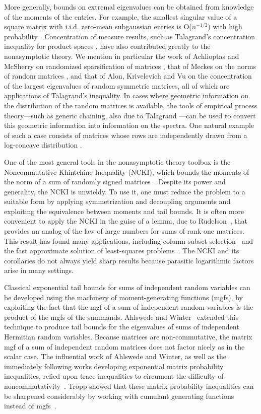 More generally, bounds on extremal eigenvalues can be obtained from knowledge of
the moments of the entries. For example, the smallest singular value of a square
matrix with i.i.d. zero-mean subgaussian entries is O($n^{-1/2}$) with high
probability \cite{RV08b}. Concentration of measure results, such as Talagrand's
concentration inequality for product spaces \cite{Talagrand95}, have also
contributed greatly to the nonasymptotic theory. We mention in particular the
work of Achlioptas and McSherry on randomized sparsification of matrices
\cite{AM01,AM07}, that of Meckes on the norms of random matrices
\cite{Meckes04}, and that of Alon, Krivelevich and Vu \cite{AKV02}
on the concentration of the largest eigenvalues of random symmetric matrices,
all of which are applications of Talagrand's inequality. In cases where
geometric information on the distribution of the random matrices is available,
the tools of empirical process theory---such as generic chaining, also due
to Talagrand \cite{
Talagrand05}---can be used to convert this geometric information into
information on the spectra. One natural example of such a case consists of
matrices whose rows are independently drawn from a log-concave distribution
\cite{MP06,ALPT10b}.

One of the most general tools in the nonasymptotic theory toolbox is
the Noncommutative Khintchine Inequality
(NCKI), which bounds the moments of the norm of a sum of randomly signed
matrices~\cite{Lust-PiquardPisier91}. Despite its power and generality, the NCKI
is unwieldy. To use it, one must reduce the problem to a suitable form by
applying symmetrization and decoupling arguments and exploiting the equivalence
between moments and tail bounds. It is often more convenient to apply the NCKI
in the guise of a lemma, due to Rudelson~\cite{RU99}, that provides an analog of
the law of large numbers for sums of rank-one matrices. This result has found
many applications, including column-subset selection~\cite{RV07} and the fast
approximate solution of least-squares problems~\cite{DMMS11}. The NCKI and its
corollaries do not always yield sharp results because parasitic logarithmic
factors arise in many settings.
 
Classical exponential tail bounds for sums of independent random variables
can be developed using the machinery of moment-generating functions (mgfs), by
exploiting the fact that the mgf of a sum of independent random variables
is the product of the mgfs of the summands. Ahlswede and 
Winter~\cite{AW02} extended this technique to produce tail bounds for the eigenvalues of
sums of independent Hermitian random variables. Because matrices are non-commutative,
the matrix mgf of a sum of independent random matrices does not factor nicely
as in the scalar case. The influential work of Ahlswede and Winter, as well as 
the immediately following works developing exponential matrix probability inequalities,
relied upon trace inequalities to circument the difficulty of noncommutativity~\cite{CM08,Recht09,Oliv09,Oliv10,Gross11}. 
Tropp showed that these matrix probability inequalities can be sharpened considerably
by working with cumulant generating functions instead of mgfs~\cite{T10a,T10b,Tropp11}.

